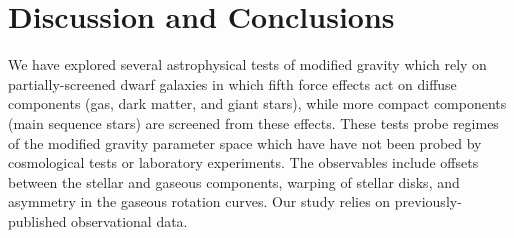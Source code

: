 \documentclass[useAMS,usenatbib,twocolumn]{mn2e}
\newcommand{\ha}{H$\alpha$}
\begin{document}





\section{Discussion and Conclusions}

\label{sec:discussion}
We have explored several astrophysical tests of modified gravity which rely on
partially-screened dwarf galaxies in which fifth force effects act on
diffuse components (gas, dark matter, and giant stars), while more
compact components (main sequence stars) are screened from these effects.
These tests probe regimes of the modified gravity
parameter space which have have not been probed by cosmological tests or
laboratory experiments.  The observables include offsets between the stellar
and gaseous components, warping of stellar disks, and asymmetry in the
gaseous rotation curves. Our study relies on previously-published
observational data.
\end{document}
